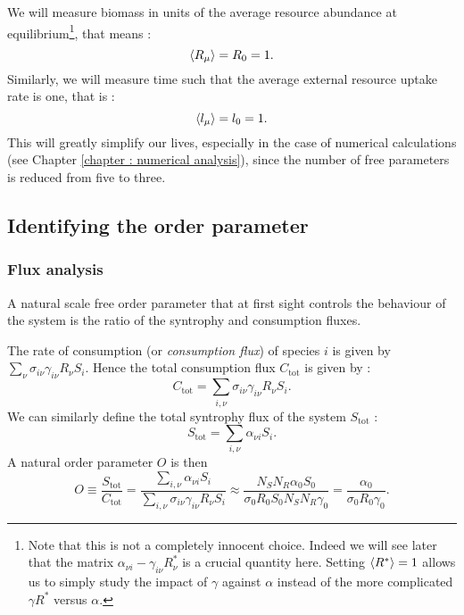 \documentclass[12pt]{report}
\begin{document}
We will measure biomass in units of the average resource abundance at equilibrium\footnote{Note that this is not a completely innocent choice. Indeed we will see later that the matrix $\alpha_{\nu i}-\gamma_{i \nu} R^*_\nu$ is a crucial quantity here. Setting $\langle R^* \rangle=1$ allows us to simply study the impact of $\gamma$ against $\alpha$ instead of the more complicated $\gamma R^*$ versus $\alpha$.}, that means :
\begin{equation}
 \langle R_\mu \rangle = R_0 = 1.
\end{equation}
Similarly, we will measure time such that the average external resource uptake rate is one, that is :
\begin{equation}
\langle l_\mu \rangle = l_0 = 1.
\end{equation}
This will greatly simplify our lives, especially in the case of numerical calculations (see Chapter \ref{chapter : numerical analysis}), since the number of free parameters is reduced from five to three.

\subsection{Identifying the order parameter}
\subsubsection{Flux analysis}
A natural scale free order parameter that at first sight controls the behaviour of the system is the ratio of the syntrophy and consumption fluxes.

The rate of consumption (or \textit{consumption flux}) of species $i$ is given by $\sum_\nu \sigma_{i\nu}\gamma_{i\nu}R_\nu S_i$. Hence the total consumption flux $C_{\text{tot}}$ is given by :
\begin{equation}
C_{\text{tot}} = \sum_{i, \nu} \sigma_{i\nu} \gamma_{i\nu}R_\nu S_i.
\end{equation}
We can similarly define the total syntrophy flux of the system $S_{\text{tot}}$ :
\begin{equation}
S_{\text{tot}} = \sum_{i, \nu} \alpha_{\nu i} S_i.
\end{equation}
A natural order parameter $O$ is then
\begin{equation}
O \equiv \frac{S_{\text{tot}}}{C_{\text{tot}}} = \frac{\sum_{i, \nu} \alpha_{\nu i} S_i}{\sum_{i,\nu}\sigma_{i\nu} \gamma_{i\nu}R_\nu S_i} \approx \frac{N_S N_R \alpha_0 S_0}{\sigma_0 R_0 S_0 N_S N_R \gamma_0} = \frac{\alpha_0}{\sigma_0 R_0 \gamma_0}.
\end{equation}
\end{document}
